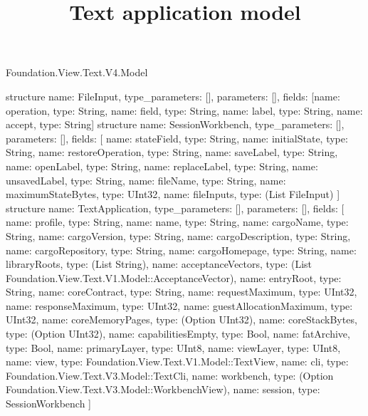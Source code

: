 \begin{lexlean}{Foundation.View.Text.V4.Model}
\title{Text application model}
\begin{semanticmodule}
structure{
 name: FileInput, type_parameters: [], parameters: [],
 fields: [{name: operation, type: String}, {name: field, type: String}, {name: label, type: String}, {name: accept, type: String}]
}
structure{
 name: SessionWorkbench, type_parameters: [], parameters: [],
 fields: [
  {name: stateField, type: String}, {name: initialState, type: String},
  {name: restoreOperation, type: String}, {name: saveLabel, type: String},
  {name: openLabel, type: String}, {name: replaceLabel, type: String}, {name: unsavedLabel, type: String},
  {name: fileName, type: String}, {name: maximumStateBytes, type: UInt32},
  {name: fileInputs, type: (List FileInput)}
 ]
}
structure{
  name: TextApplication,
  type_parameters: [],
  parameters: [],
  fields: [
    {name: profile, type: String},
    {name: name, type: String},
    {name: cargoName, type: String},
    {name: cargoVersion, type: String},
    {name: cargoDescription, type: String},
    {name: cargoRepository, type: String},
    {name: cargoHomepage, type: String},
    {name: libraryRoots, type: (List String)},
    {name: acceptanceVectors, type: (List Foundation.View.Text.V1.Model::AcceptanceVector)},
    {name: entryRoot, type: String},
    {name: coreContract, type: String},
    {name: requestMaximum, type: UInt32},
    {name: responseMaximum, type: UInt32},
    {name: guestAllocationMaximum, type: UInt32},
    {name: coreMemoryPages, type: (Option UInt32)},
    {name: coreStackBytes, type: (Option UInt32)},
    {name: capabilitiesEmpty, type: Bool},
    {name: fatArchive, type: Bool},
    {name: primaryLayer, type: UInt8},
    {name: viewLayer, type: UInt8},
    {name: view, type: Foundation.View.Text.V1.Model::TextView},
    {name: cli, type: Foundation.View.Text.V3.Model::TextCli},
    {name: workbench, type: (Option Foundation.View.Text.V3.Model::WorkbenchView)},
    {name: session, type: SessionWorkbench}
  ]
}
\end{semanticmodule}
\end{lexlean}
